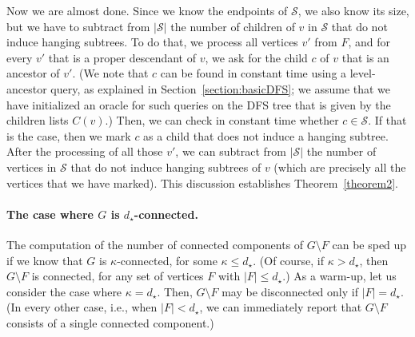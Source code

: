 \documentclass[11pt,a4paper]{article}
\begin{document}
Now we are almost done. Since we know the endpoints of $\mathcal{S}$, we also know its size, but we have to subtract from $|\mathcal{S}|$ the number of children of $v$ in $\mathcal{S}$ that do not induce hanging subtrees. To do that, we process all vertices $v'$ from $F$, and for every $v'$ that is a proper descendant of $v$, we ask for the child $c$ of $v$ that is an ancestor of $v'$. (We note that $c$ can be found in constant time using a level-ancestor query, as explained in Section~\ref{section:basicDFS}; we assume that we have initialized an oracle for such queries on the DFS tree that is given by the children lists $C(v)$.) Then, we can check in constant time whether $c\in \mathcal{S}$. If that is the case, then we mark $c$ as a child that does not induce a hanging subtree. After the processing of all those $v'$, we can subtract from $|\mathcal{S}|$ the number of vertices in $\mathcal{S}$ that do not induce hanging subtrees of $v$ (which are precisely all the vertices that we have marked). 
This discussion establishes Theorem~\ref{theorem2}. 



\paragraph{The case where $G$ is $d_{\star}$-connected.}
The computation of the number of connected components of $G\setminus F$ can be sped up if we know that $G$ is $\kappa$-connected, for some $\kappa\leq d_{\star}$. (Of course, if $\kappa>d_{\star}$, then $G\setminus F$ is connected, for any set of vertices $F$ with $|F|\leq d_{\star}$.) As a warm-up, let us consider the case where $\kappa=d_{\star}$. Then, $G\setminus F$ may be disconnected only if $|F|=d_{\star}$. (In every other case, i.e., when $|F|<d_{\star}$, we can immediately report that $G\setminus F$ consists of a single connected component.)
\end{document}
